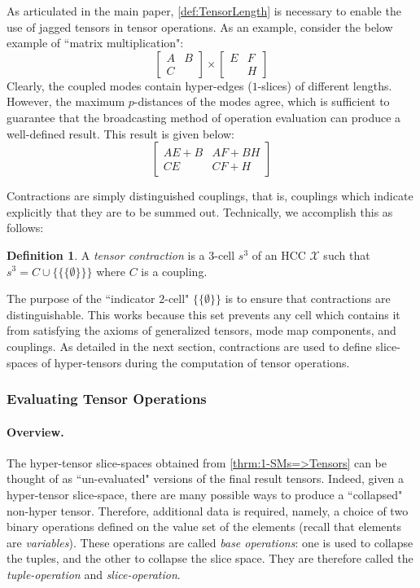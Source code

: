 \documentclass{article}
\theoremstyle{plain}
\theoremstyle{definition}
\newtheorem{definition}[theorem]{Definition}
\theoremstyle{remark}
\newcommand{\cX}{\mathcal{X}}
\let\oldparagraph\paragraph
\renewcommand{\paragraph}[1]{%
	\vspace{-0.5em}%
	\oldparagraph{#1}%
}
\begin{document}
As articulated in the main paper, \cref{def:TensorLength} is necessary to enable the use of jagged tensors in tensor operations. As an example, consider the below example of ``matrix multiplication":
\begin{equation*}
	\begin{bmatrix}
		A & B\\
		C & 
	\end{bmatrix} \times
	\begin{bmatrix}
		E & F\\
		& H
	\end{bmatrix}
\end{equation*}
Clearly, the coupled modes contain hyper-edges ($1$-slices) of different lengths. However, the maximum $p$-distances of the modes agree, which is sufficient to guarantee that the broadcasting method of operation evaluation can produce a well-defined result. This result is given below:
\begin{equation*}
	\begin{bmatrix}
		AE + B & AF + BH\\
		CE & CF + H
	\end{bmatrix}
\end{equation*}

Contractions are simply distinguished couplings, that is, couplings which indicate explicitly that they are to be summed out. Technically, we accomplish this as follows:
\begin{definition}
	A \textit{tensor contraction} is a $3$-cell $s^3$ of an HCC $\cX$ such that $s^3 = C \cup \Big\{\big\{\{ \emptyset \}\big\}\Big\}$ where $C$ is a coupling.
\end{definition}
The purpose of the ``indicator $2$-cell" $\big\{\{ \emptyset \}\big\}$ is to ensure that contractions are distinguishable. This works because this set prevents any cell which contains it from satisfying the axioms of generalized tensors, mode map components, and couplings. As detailed in the next section, contractions are used to define slice-spaces of hyper-tensors during the computation of tensor operations.

\subsubsection{\label{sec:TensorOps_Eval}Evaluating Tensor Operations}
\paragraph{Overview.}
The hyper-tensor slice-spaces obtained from \cref{thrm:1-SMs=>Tensors} can be thought of as ``un-evaluated" versions of the final result tensors. Indeed, given a hyper-tensor slice-space, there are many possible ways to produce a ``collapsed" non-hyper tensor. Therefore, additional data is required, namely, a choice of two binary operations defined on the value set of the elements (recall that elements are \textit{variables}). These operations are called \textit{base operations}: one is used to collapse the tuples, and the other to collapse the slice space. They are therefore called the \textit{tuple-operation} and \textit{slice-operation}.
\end{document}
